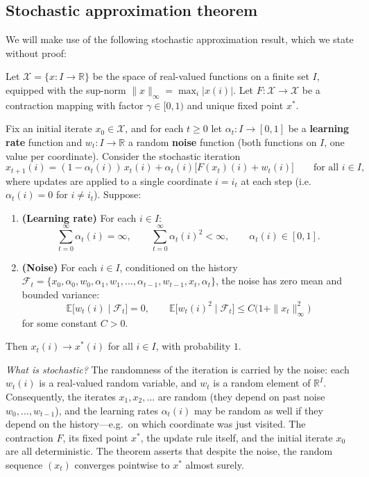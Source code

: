 \documentclass[11pt]{article}
\begin{document}
\subsection*{Stochastic approximation theorem}

We will make use of the following stochastic approximation result, which we state without proof:

\begin{theorem}\label{thm:stochastic_approx}
Let $\mathcal{X} = \{x : I \to \mathbb{R}\}$ be the space of real-valued functions on a finite set $I$, equipped with the sup-norm $\|x\|_\infty = \max_i |x(i)|$. Let $F : \mathcal{X} \to \mathcal{X}$ be a contraction mapping with factor $\gamma \in [0,1)$ and unique fixed point $x^*$.

Fix an initial iterate $x_0 \in \mathcal{X}$, and for each $t \geq 0$ let $\alpha_t : I \to [0,1]$ be a \textbf{learning rate} function and $w_t : I \to \mathbb{R}$ a random \textbf{noise} function (both functions on $I$, one value per coordinate). Consider the stochastic iteration
$$
x_{t+1}(i) = (1 - \alpha_t(i))\, x_t(i) + \alpha_t(i)\bigl[F(x_t)(i) + w_t(i)\bigr] \qquad \text{for all } i \in I,
$$
where updates are applied to a single coordinate $i = i_t$ at each step (i.e.\ $\alpha_t(i) = 0$ for $i \neq i_t$). Suppose:
\begin{enumerate}
\item[(a)] \textbf{(Learning rate)} For each $i \in I$:
$$
\sum_{t=0}^{\infty} \alpha_t(i) = \infty, \qquad \sum_{t=0}^{\infty} \alpha_t(i)^2 < \infty, \qquad \alpha_t(i) \in [0,1].
$$
\item[(b)] \textbf{(Noise)} For each $i \in I$, conditioned on the history $\mathcal{F}_t = \{x_0, \alpha_0, w_0, \alpha_1, w_1, \ldots, \alpha_{t-1}, w_{t-1}, x_t, \alpha_t\}$, the noise has zero mean and bounded variance:
$$
\mathbb{E}\big[w_t(i) \mid \mathcal{F}_t\big] = 0, \qquad \mathbb{E}\big[w_t(i)^2 \mid \mathcal{F}_t\big] \le C\bigl(1 + \|x_t\|_\infty^2\bigr)
$$
for some constant $C > 0$.
\end{enumerate}
Then $x_t(i) \to x^*(i)$ for all $i \in I$, with probability $1$.
\end{theorem}

\emph{What is stochastic?}
The randomness of the iteration is carried by the noise: each $w_t(i)$ is a real-valued random variable, and $w_t$ is a random element of $\mathbb{R}^I$. Consequently, the iterates $x_1, x_2, \ldots$ are random (they depend on past noise $w_0, \ldots, w_{t-1}$), and the learning rates $\alpha_t(i)$ may be random as well if they depend on the history---e.g.\ on which coordinate was just visited. The contraction $F$, its fixed point $x^*$, the update rule itself, and the initial iterate $x_0$ are all deterministic. The theorem asserts that despite the noise, the random sequence $(x_t)$ converges pointwise to $x^*$ almost surely.
\end{document}
